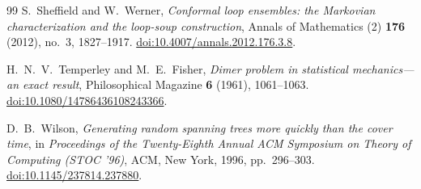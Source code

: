 \begin{thebibliography}{99}
S.~Sheffield and W.~Werner,
\emph{Conformal loop ensembles: the Markovian characterization and
the loop-soup construction},
Annals of Mathematics (2) \textbf{176} (2012), no.~3, 1827--1917.
\href{https://doi.org/10.4007/annals.2012.176.3.8}{doi:10.4007/annals.2012.176.3.8}.

H.~N.~V.~Temperley and M.~E.~Fisher,
\emph{Dimer problem in statistical mechanics---an exact result},
Philosophical Magazine \textbf{6} (1961), 1061--1063.
\href{https://doi.org/10.1080/14786436108243366}{doi:10.1080/14786436108243366}.

D.~B.~Wilson,
\emph{Generating random spanning trees more quickly than the cover time},
in \emph{Proceedings of the Twenty-Eighth Annual ACM Symposium on Theory
of Computing (STOC '96)}, ACM, New York, 1996, pp.~296--303.
\href{https://doi.org/10.1145/237814.237880}{doi:10.1145/237814.237880}.

\end{thebibliography}
